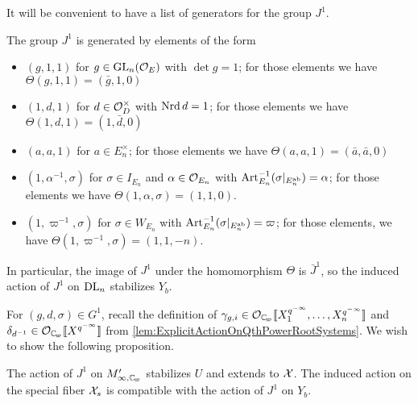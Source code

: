 \documentclass[../main.tex]{subfiles}
\begin{document}
It will be convenient to have a list of generators for the group $J^1$. 
\begin{lem}\label{lem:GeneratorsForJ1}
  The group $J^1$ is generated by elements of the form
  \begin{itemize}
    \item $(g,1,1)$ for $g \in \operatorname{GL}_n(\mathcal{O}_E)$ with $\det g = 1$; for those
      elements we have $\Theta(g,1,1) = (\bar g, 1,0)$
    \item $(1,d,1)$ for $d \in \mathcal{O}_D^\times$ with $\operatorname{Nrd} d = 1$; for those
      elements we have $\Theta(1,d,1) = (1 , \bar d,0)$
    \item $(a,a,1)$ for $a \in E_n^\times$; for those
      elements we have $\Theta(a,a,1) = (\bar a, \bar a,0)$
    \item $(1, \alpha^{-1}, \sigma)$ for $\sigma \in I_{E_n}$ 
      and $\alpha \in \mathcal{O}_{E_n}$ with $\operatorname{Art}_{E_n}^{-1}(\sigma|_{E_n^{\mathrm{ab}}}) = \alpha$;
      for those elements we have $\Theta(1,\alpha,\sigma) = (1, 1,0)$.
    \item $(1, \varpi^{-1}, \sigma)$ for $\sigma \in W_{E_n}$ with
      $\operatorname{Art}^{-1}_{E_n}(\sigma|_{E_n^{\mathrm{ab}}}) \allowbreak = \varpi$; for those
elements, we have $\Theta(1,\varpi^{-1},\sigma) \allowbreak = (1, 1, -n)$. 
  \end{itemize}
  \end{lem}
In particular, the image of $J^1$ under the homomorphism $\Theta$ is 
$\bar J^1$, so the induced action of $J^1$ on $\mathrm{DL}_n$ stabilizes $Y_b$.

For $(g,d,\sigma) \in G^1$, recall the definition of $\gamma_{g,i} \in \cO_\Cp\llbr
X_1^{q^{-\infty}}, \dots, X_n^{q^{-\infty}}\rrbr$ and 
$\delta_{d^{-1}} \in \cO_\Cp \llbr X^{q^{-\infty}} \rrbr$ from 
\cref{lem:ExplicitActionOnQthPowerRootSystems}. 
We wish to show the following proposition.

\begin{prop}\label{prop:J1ActionOnAffinoid}
  The action of $J^1$ on $M_{\infty, \Cp}'$ stabilizes $U$ and extends to
  $\mathcal{X}$. The induced action on the special fiber $\mathcal{X}_s$ is compatible with the
  action of $J^1$ on $Y_b$.
\end{prop}
\end{document}
